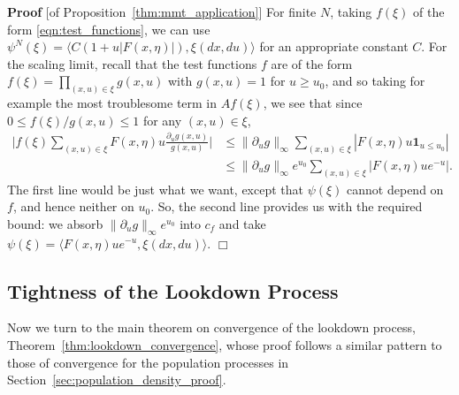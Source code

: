 \documentclass[12pt]{article}
\newenvironment {proof}{{\noindent\bf Proof }}{\hfill $\Box$ \medskip}
\newcommand{\ind}{\mathbf{1}}
\newcommand{\lp}{\xi}              %
\numberwithin{equation}{section}
\begin{document}
\begin{proof}[of Proposition~\ref{thm:mmt_application}]
    For finite $N$,
    taking $f(\lp)$ of the form \eqref{eqn:test_functions},
    we can use $\psi^N(\lp) = \langle C (1 + u |F(x, \eta)|), \lp(dx, du) \rangle$
    for an appropriate constant $C$.
    For the scaling limit, recall that the test functions $f$ are of the form
    $f(\lp) = \prod_{(x, u) \in \lp} g(x, u)$
    with $g(x, u) = 1$ for $u \ge u_0$,
    and so taking for example the most troublesome term in $Af(\lp)$,
    we see that since $0 \le f(\lp) / g(x, u) \le 1$ for any $(x, u) \in \lp$,
    \begin{align*} %
        \big| f(\lp) \sum_{(x, u) \in \lp} F(x, \eta) u \frac{\partial_u g(x, u)}{g(x, u)} \big|
        & \le
        \| \partial_u g \|_\infty \sum_{(x, u) \in \lp} | F(x, \eta) u \ind_{u \le u_0} | \\
        & \le
        \| \partial_u g \|_\infty e^{u_0} \sum_{(x, u) \in \lp} | F(x, \eta) u e^{-u} | .
    \end{align*}
    The first line would be just what we want,
    except that $\psi(\lp)$ cannot depend on $f$, and hence neither on $u_0$.
    So, the second line provides us with the required bound:
    we absorb $\| \partial_u g \|_\infty e^{u_0}$ into $c_f$
    and take $\psi(\lp) = \langle F(x, \eta) u e^{-u}, \lp(dx, du) \rangle$.
\end{proof}


\subsection{Tightness of the Lookdown Process}
    \label{sec:lookdown_convergence}

Now we turn to the main theorem on convergence of the lookdown process, 
Theorem~\ref{thm:lookdown_convergence}, whose proof
follows a similar pattern to those of convergence for the population processes
in Section~\ref{sec:population_density_proof}.
\end{document}
